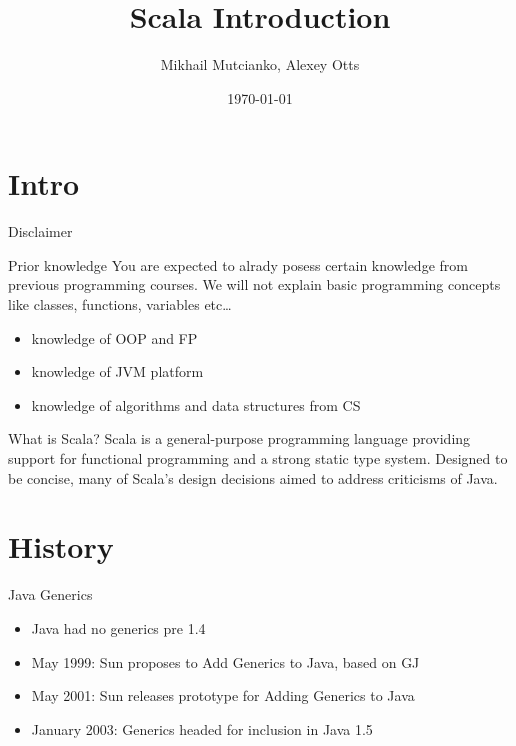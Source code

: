 \documentclass[aspectratio=169]{beamer}
\title{Scala Introduction}
\author{Mikhail Mutcianko, Alexey Otts}
\institute{СПБгУ, СП}
\date{\today}
\begin{document}
\frame{\titlepage}

\section{Intro}

\begin{frame}{Disclaimer}
  \begin{block}{Prior knowledge}
    You are expected to alrady posess certain knowledge from previous programming courses.
    We will not explain basic programming concepts like classes, functions, variables etc\ldots
  \end{block}
  \pause
  \begin{itemize}
    \item knowledge of OOP and FP
      \pause
    \item knowledge of JVM platform
      \pause
    \item knowledge of algorithms and data structures from CS
  \end{itemize}
\end{frame}

\begin{frame}{What is Scala?}
  Scala is a general-purpose programming language providing support for
  functional programming and a strong static type system. Designed to be concise, many of Scala's
  design decisions aimed to address criticisms of Java.
\end{frame}

\section{History}

\begin{frame}{Java Generics}
  \begin{itemize}
    \item Java had no generics pre 1.4
    \item May 1999: Sun proposes to Add Generics to Java, based on GJ
    \item May 2001: Sun releases prototype for Adding Generics to Java
    \item January 2003: Generics headed for inclusion in Java 1.5
  \end{itemize}
\end{frame}
\end{document}
